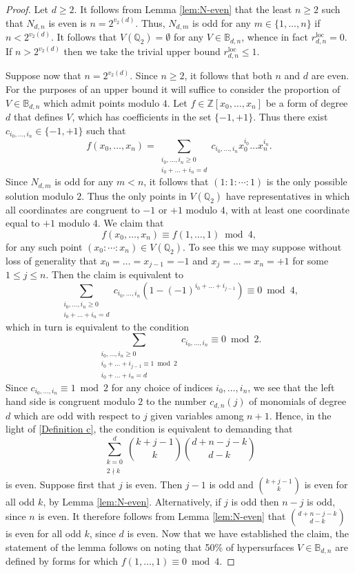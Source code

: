\documentclass[11pt, reqno]{amsart}
\numberwithin{equation}{section}
\renewcommand{\leq}{\leqslant}
\renewcommand{\geq}{\geqslant}
\begin{document}
\begin{proof}
Let $d\geq 2$. 
It follows from Lemma 
\ref{lem:N-even} that  the least $n \geq 2$ such that $N_{d,n}$ is even is $n = 2^{v_2(d)}$.
Thus,  $N_{d,m}$ is odd for any  $m \in \{1, \dots, n \}$ if $n < 2^{v_2(d)}$. 
It follows that $V(\mathbb{Q}_2) = \emptyset$ for  any $V \in \mathbb{B}_{d,n}$, whence in 
fact $r _{d,n}^{\mathrm{loc}} = 0$.
If $n > 2^{v_2(d)}$ then we take the trivial  upper bound 
 $r _{d,n}^{\mathrm{loc}} \leq 1$.
 
Suppose now that  $n = 2^{v_2(d)}$. Since $n\geq 2$, it follows that both $n$ and $d$ are even. 
For the purposes of an upper bound it will suffice to consider the proportion of $V \in \mathbb{B}_{d,n}$ which admit points modulo $4$.  Let $f\in \mathbb{Z}[x_0,\dots,x_n]$ be a form of degree $d$ that defines $V$, which has coefficients in the set $\{-1,+1\}$.  
Thus there exist  $c_{i_0,\dots,i_n}\in \{-1,+1\}$ such that 
$$
f(x_0,\dots,x_n)=\sum_{\substack{
i_0,\dots,i_n\geq 0\\
i_0+\dots+i_n=d
}}c_{i_0,\dots,i_n} x_0^{i_0}\dots x_n^{i_n}.
$$
Since $N_{d,m}$ is odd for any $m<n$, it follows that $(1:1:\cdots:1)$ is the only  possible solution modulo  $2$.  Thus the  only points in $V(\mathbb{Q}_2)$ have representatives in which all coordinates are congruent to $-1$ or $+1$ modulo $4$, with at least one coordinate equal to $+1$ modulo $4$. 
We claim that 
$$
f(x_0,\dots,x_n)\equiv  f(1,\dots,1) \bmod{4},
$$
for any such point $(x_0:\cdots:x_n)\in V(\mathbb{Q}_2)$. To see this we may suppose  without loss of generality that  $x_0=\dots=x_{j-1}=-1$ and $x_{j}=\dots=x_n=+1$ for some $1\leq j\leq n$.
Then 
the claim is equivalent to 
$$
\sum_{\substack{
i_0,\dots,i_n\geq 0\\
i_0+\dots+i_n=d
}}c_{i_0,\dots,i_n} \left( 1-(-1)^{i_0+\dots+i_{j-1}} \right) \equiv 0\bmod{4},
$$
which in turn is equivalent to the condition 
$$
\sum_{\substack{
i_0,\dots,i_n\geq 0\\
i_0+\dots+i_{j-1}\equiv 1 \bmod{2}\\
i_0+\dots+i_n=d
}}c_{i_0,\dots,i_n}  \equiv 0\bmod{2}.
$$
Since $c_{i_0,\dots,i_n}\equiv 1 \bmod{2}$ for any choice of indices $i_0,\dots,i_n$, we see that 
the left hand side is congruent modulo $2$ to the number $c_{d,n}(j)$
of monomials of degree $d$ which are odd with respect to $j$ given variables among $n+1$. 
Hence, in the light of  \eqref{Definition c}, the condition is equivalent to demanding that 
$$
\sum_{\substack{k=0 \\ 2 \nmid k}}^d \binom{k+j-1}{k} \binom{d+n-j-k}{d-k} 
$$
is even.  
Suppose first that $j$ is even. Then $j-1$ is odd and  $\binom{k+j-1}{k}$ is even for all odd $k$, by Lemma 
\ref{lem:N-even}. Alternatively, if $j$ is odd then
$n-j$ is odd, since $n$ is even. It therefore follows from Lemma 
\ref{lem:N-even} that 
$\binom{d+n-j-k}{d-k} $ 
is  even for all odd $k$, since  $d$ is even. 
Now that we have established the claim, the
 statement of the lemma follows on noting that 50\% of hypersurfaces 
$V\in \mathbb{B}_{d,n}$ are defined by forms for which 
$f(1,\dots,1)\equiv 0 \bmod{4}$.
\end{proof}
\end{document}
